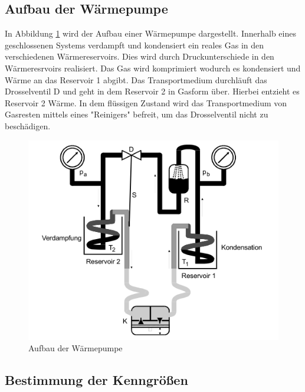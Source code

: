 \subsection{Aufbau der Wärmepumpe}
\label{sec:AdW}
In Abbildung \ref{fig:aufbau} wird der Aufbau einer Wärmepumpe dargestellt.
Innerhalb eines geschlossenen Systems verdampft und kondensiert ein reales Gas in den verschiedenen Wärmereservoirs.
Dies wird durch Druckunterschiede in den Wärmeresrvoirs realisiert.
Das Gas wird komprimiert wodurch es kondensiert und Wärme an das Reservoir 1 abgibt.
Das Transportmedium durchläuft das Drosselventil D und geht in dem Reservoir 2 in Gasform über.
Hierbei entzieht es Reservoir 2 Wärme.
In dem flüssigen Zustand wird das Transportmedium von Gasresten mittels eines "Reinigers" befreit, um das Drosselventil nicht zu beschädigen.
\begin{figure}[H]
    \centering
    \includegraphics[width=\textwidth]{content/aufbau.png}
    \caption{Aufbau der Wärmepumpe}
    \label{fig:aufbau}
\end{figure}
\subsection{Bestimmung der Kenngrößen}
\label{sec:BdK}
